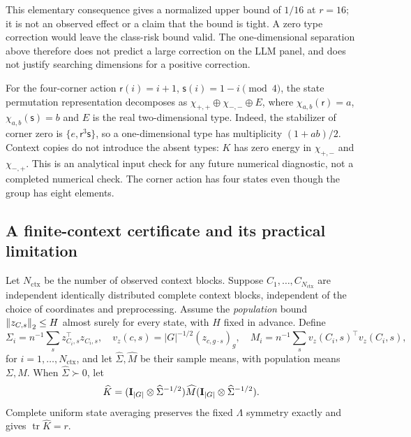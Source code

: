 This elementary consequence gives a normalized upper bound of $1/16$ at $r=16$; it is not an observed effect or a claim that the bound is tight. A zero type correction would leave the class-risk bound valid. The one-dimensional separation above therefore does not predict a large correction on the LLM panel, and does not justify searching dimensions for a positive correction.

For the four-corner action $\mathsf r(i)=i+1$, $\mathsf s(i)=1-i\pmod4$, the state permutation representation decomposes as $\chi_{+,+}\oplus\chi_{-,-}\oplus E$, where $\chi_{a,b}(\mathsf r)=a$, $\chi_{a,b}(\mathsf s)=b$ and $E$ is the real two-dimensional type. Indeed, the stabilizer of corner zero is $\{e,\mathsf r^3\mathsf s\}$, so a one-dimensional type has multiplicity $(1+ab)/2$. Context copies do not introduce the absent types: $K$ has zero energy in $\chi_{+,-}$ and $\chi_{-,+}$. This is an analytical input check for any future numerical diagnostic, not a completed numerical check. The corner action has four states even though the group has eight elements.

\subsection{A finite-context certificate and its practical limitation}
\label{sp:certificate}
Let $N_{\mathrm{ctx}}$ be the number of observed context blocks. Suppose $C_1,\ldots,C_{N_{\mathrm{ctx}}}$ are independent identically distributed complete context blocks, independent of the choice of coordinates and preprocessing. Assume the \emph{population} bound $\left\lVert z_{C,s}\right\rVert_2\le H$ almost surely for every state, with $H$ fixed in advance. Define
\[
 \Sigma_i=n^{-1}\sum_sz_{C_i,s}^\top z_{C_i,s},\quad
 v_z(c,s)=|G|^{-1/2}(z_{c,g\cdot s})_g,\quad
 M_i=n^{-1}\sum_sv_z(C_i,s)^\top v_z(C_i,s),
\]
for $i=1,\ldots,N_{\mathrm{ctx}}$, and let $\widehat\Sigma,\widehat M$ be their sample means, with population means $\Sigma,M$. When $\widehat\Sigma\succ0$, let
\[
 \widehat K=(\mathbf{I}_{|G|}\otimes\widehat\Sigma^{-1/2})\widehat M
                    (\mathbf{I}_{|G|}\otimes\widehat\Sigma^{-1/2}).
\]
Complete uniform state averaging preserves the fixed $\Lambda$ symmetry exactly and gives $\operatorname{tr}\widehat K=r$.

